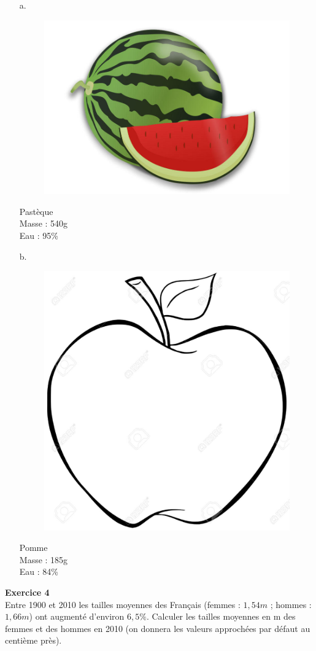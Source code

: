 \documentclass[12pt]{article}
\newcommand{\Pointille}[1][3]{\multido{}{#1}{    \makebox[\linewidth]{\dotfill}\\[\parskip]}}
\begin{document}
\begin{multicols}{2}
  \begin{enumerate}
  \item[a.] 
    \begin{figure}[H]
      \centering
      \includegraphics[width=0.3\linewidth]{sources/2/pasteque.jpg}
    \end{figure}
    Pastèque\\
    Masse : 540g\\
    Eau : 95\%\\
    \Pointille[3]

  \item [b.]
    \begin{figure}[H]
      \centering
      \includegraphics[width=0.2\linewidth]{sources/2/pomme.jpg}
    \end{figure}
    Pomme\\
    Masse : 185g\\
    Eau : 84\%\\
    \Pointille[3]
  \end{enumerate}
\end{multicols}


\begin{multicols}{2}
  \textbf{Exercice 4}\\
  Entre 1900 et 2010 les tailles moyennes des Français (femmes : $1,54m$ ; hommes : $1,66m$) ont augmenté d'environ $6,5\%$. Calculer les tailles moyennes en m des femmes et des hommes en 2010 (on donnera les valeurs approchées par défaut au centième près).\\

  \Pointille[6]

\end{multicols}
\end{document}
